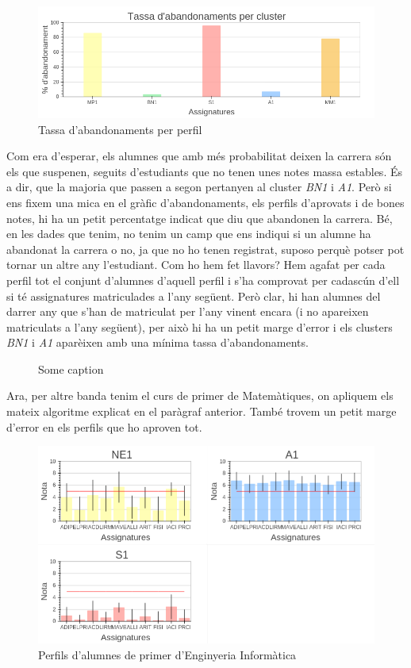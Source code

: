 \documentclass[12pt,a4paper,catalan]{article}
\begin{document}
\begin{figure}[h]
\centering
\includegraphics[width=\linewidth]{img/abandonaments_primer_info.png}
\caption{Tassa d'abandonaments per perfil}
\end{figure}

Com era d'esperar, els alumnes que amb més probabilitat deixen la carrera són els que suspenen, seguits d'estudiants que no tenen unes notes massa estables. És a dir, que la majoria que passen a segon pertanyen al cluster \textit{BN1} i \textit{A1}. Però si ens fixem una mica en el gràfic d'abandonaments, els perfils d'aprovats i de bones notes, hi ha un petit percentatge indicat que diu que abandonen la carrera. Bé, en les dades que tenim, no tenim un camp que ens indiqui si un alumne ha abandonat la carrera o no, ja que no ho tenen registrat, suposo perquè potser pot tornar un altre any l'estudiant. Com ho hem fet llavors? Hem agafat per cada perfil tot el conjunt d'alumnes d'aquell perfil i s'ha comprovat per cadascún d'ell si té assignatures matriculades a l'any següent. Però clar, hi han alumnes del darrer any que s'han de matriculat per l'any vinent encara (i no apareixen matriculats a l'any següent), per això hi ha un petit marge d'error i els clusters \textit{BN1} i \textit{A1} aparèixen amb una mínima tassa d'abandonaments. 

\begin{figure}[h]
\centering
{}
\caption{Some caption}
\end{figure}

Ara, per altre banda tenim el curs de primer de Matemàtiques, on apliquem els mateix algoritme explicat en el paràgraf anterior. També trovem un petit marge d'error en els perfils que ho aproven tot.

\begin{figure}[h]
\centering
\includegraphics[width=\linewidth]{img/perfils_primer_mates.png}
\caption{Perfils d'alumnes de primer d'Enginyeria Informàtica}
\end{figure}
\end{document}
